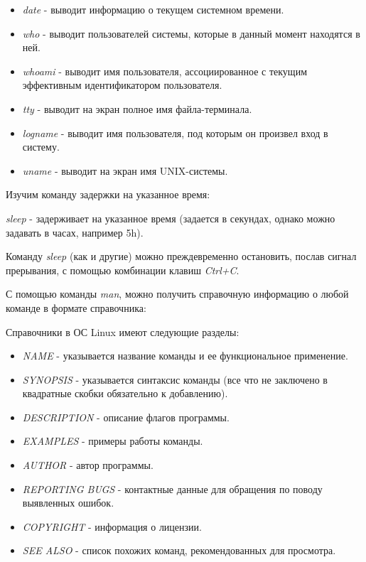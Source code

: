 \documentclass[14pt,a4paper,report]{report}
\begin{document}
\begin{itemize}
	\item \emph{date} - выводит информацию о текущем системном времени.
	\item \emph{who} - выводит пользователей системы, которые в данный момент находятся в ней.
	\item \emph{whoami} - выводит имя пользователя, ассоциированное с текущим эффективным идентификатором пользователя.
	\item \emph{tty} - выводит на экран полное имя файла-терминала.
	\item \emph{logname} - выводит имя пользователя, под которым он произвел вход в систему.
	\item \emph{uname} - выводит на экран имя UNIX-системы. 
\end{itemize}

Изучим команду задержки на указанное время:



\emph{sleep} - задерживает на указанное время (задается в секундах, однако можно задавать в часах, например 5h).

Команду \emph{sleep} (как и другие) можно преждевременно остановить, послав сигнал прерывания, с помощью комбинации клавиш \emph{Ctrl+C}.

С помощью команды \emph{man}, можно получить справочную информацию о любой команде в формате справочника:



Справочники в ОС Linux имеют следующие разделы:

\begin{itemize}
	\item \emph{NAME} - указывается название команды и ее функциональное применение.
	\item \emph{SYNOPSIS} - указывается синтаксис команды (все что не заключено в квадратные скобки обязательно к добавлению).
	\item \emph{DESCRIPTION} - описание флагов программы.
	\item \emph{EXAMPLES} - примеры работы команды.
	\item \emph{AUTHOR} - автор программы.
	\item \emph{REPORTING BUGS} - контактные данные для обращения по поводу выявленных ошибок.
	\item \emph{COPYRIGHT} - информация о лицензии.
	\item \emph{SEE ALSO} - список похожих команд, рекомендованных для просмотра.
\end{itemize}
\end{document}
